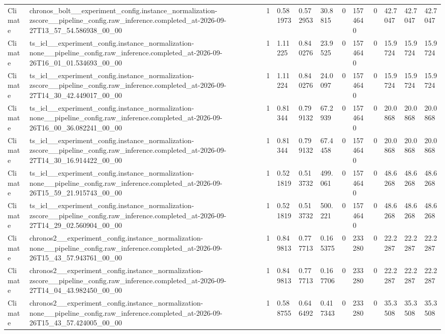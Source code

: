 \begin{tabular}{llllllllllll}
Climate & chronos\_bolt\_\_experiment\_config.instance\_normalization-zscore\_\_pipeline\_config.raw\_inference.completed\_at-2026-09-27T13\_57\_54.586938\_00\_00 & 1 & 0.581973 & 0.572953 & 30.8815 & 0 & 1574640 & 0 & 42.7047 & 42.7047 & 42.7047 \\
Climate & ts\_icl\_\_experiment\_config.instance\_normalization-none\_\_pipeline\_config.raw\_inference.completed\_at-2026-09-26T16\_01\_01.534693\_00\_00 & 1 & 1.11225 & 0.840276 & 23.9525 & 0 & 1574640 & 0 & 15.9724 & 15.9724 & 15.9724 \\
Climate & ts\_icl\_\_experiment\_config.instance\_normalization-zscore\_\_pipeline\_config.raw\_inference.completed\_at-2026-09-27T14\_30\_42.449017\_00\_00 & 1 & 1.11224 & 0.840276 & 24.0097 & 0 & 1574640 & 0 & 15.9724 & 15.9724 & 15.9724 \\
Climate & ts\_icl\_\_experiment\_config.instance\_normalization-none\_\_pipeline\_config.raw\_inference.completed\_at-2026-09-26T16\_00\_36.082241\_00\_00 & 1 & 0.81344 & 0.799132 & 67.2939 & 0 & 1574640 & 0 & 20.0868 & 20.0868 & 20.0868 \\
Climate & ts\_icl\_\_experiment\_config.instance\_normalization-zscore\_\_pipeline\_config.raw\_inference.completed\_at-2026-09-27T14\_30\_16.914422\_00\_00 & 1 & 0.81344 & 0.799132 & 67.4458 & 0 & 1574640 & 0 & 20.0868 & 20.0868 & 20.0868 \\
Climate & ts\_icl\_\_experiment\_config.instance\_normalization-none\_\_pipeline\_config.raw\_inference.completed\_at-2026-09-26T15\_59\_21.915743\_00\_00 & 1 & 0.521819 & 0.513732 & 499.061 & 0 & 1574640 & 0 & 48.6268 & 48.6268 & 48.6268 \\
Climate & ts\_icl\_\_experiment\_config.instance\_normalization-zscore\_\_pipeline\_config.raw\_inference.completed\_at-2026-09-27T14\_29\_02.560904\_00\_00 & 1 & 0.521819 & 0.513732 & 500.221 & 0 & 1574640 & 0 & 48.6268 & 48.6268 & 48.6268 \\
Climate & chronos2\_\_experiment\_config.instance\_normalization-none\_\_pipeline\_config.raw\_inference.completed\_at-2026-09-26T15\_43\_57.943761\_00\_00 & 1 & 0.849813 & 0.777713 & 0.165375 & 0 & 233280 & 0 & 22.2287 & 22.2287 & 22.2287 \\
Climate & chronos2\_\_experiment\_config.instance\_normalization-zscore\_\_pipeline\_config.raw\_inference.completed\_at-2026-09-27T14\_04\_43.982450\_00\_00 & 1 & 0.849813 & 0.777713 & 0.167706 & 0 & 233280 & 0 & 22.2287 & 22.2287 & 22.2287 \\
Climate & chronos2\_\_experiment\_config.instance\_normalization-none\_\_pipeline\_config.raw\_inference.completed\_at-2026-09-26T15\_43\_57.424005\_00\_00 & 1 & 0.588755 & 0.646492 & 0.417343 & 0 & 233280 & 0 & 35.3508 & 35.3508 & 35.3508 \\

\end{tabular}
